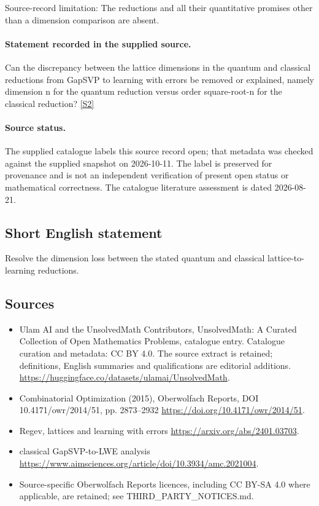 \documentclass[11pt]{article}
\begin{document}
Source-record limitation: The reductions and all their quantitative promises other than a dimension comparison are absent.
\paragraph{Statement recorded in the supplied source.}
Can the discrepancy between the lattice dimensions in the quantum and classical reductions from GapSVP to learning with errors be removed or explained, namely dimension n for the quantum reduction versus order square-root-n for the classical reduction? \href{https://doi.org/10.4171/owr/2014/51}{[S2]}
\paragraph{Source status.}
The supplied catalogue labels this source record open; that metadata was checked against the supplied snapshot on 2026-10-11. The label is preserved for provenance and is not an independent verification of present open status or mathematical correctness. The catalogue literature assessment is dated 2026-08-21.
\subsection{Short English statement}
Resolve the dimension loss between the stated quantum and classical lattice-to-learning reductions.
\subsection{Sources}
\begin{itemize}
\item[S1] Ulam AI and the UnsolvedMath Contributors, UnsolvedMath: A Curated Collection of Open Mathematics Problems, catalogue entry. Catalogue curation and metadata: CC BY 4.0. The source extract is retained; definitions, English summaries and qualifications are editorial additions.
\url{https://huggingface.co/datasets/ulamai/UnsolvedMath}.
\item[S2] Combinatorial Optimization (2015), Oberwolfach Reports, DOI 10.4171/owr/2014/51, pp. 2873--2932
\url{https://doi.org/10.4171/owr/2014/51}.
\item[S3] Regev, lattices and learning with errors
\url{https://arxiv.org/abs/2401.03703}.
\item[S4] classical GapSVP-to-LWE analysis
\url{https://www.aimsciences.org/article/doi/10.3934/amc.2021004}.
\item Source-specific Oberwolfach Reports licences, including CC BY-SA 4.0 where applicable, are retained; see THIRD\_PARTY\_NOTICES.md.
\end{itemize}
\end{document}
